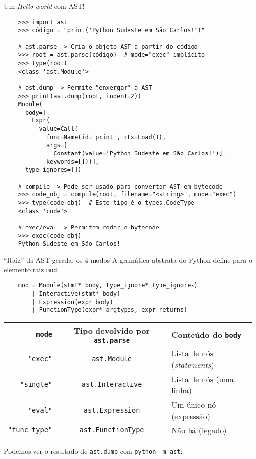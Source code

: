 \documentclass[utf8]{beamer}
\begin{document}
\begin{frame}[fragile]{Um \emph{Hello world} com AST!}
  \vspace{-.8em}%
  \begin{verbatim}
    >>> import ast
    >>> código = "print('Python Sudeste em São Carlos!')"

    # ast.parse -> Cria o objeto AST a partir do código
    >>> root = ast.parse(código)  # mode="exec" implícito
    >>> type(root)
    <class 'ast.Module'>

    # ast.dump -> Permite "enxergar" a AST
    >>> print(ast.dump(root, indent=2))
    Module(
      body=[
        Expr(
          value=Call(
            func=Name(id='print', ctx=Load()),
            args=[
              Constant(value='Python Sudeste em São Carlos!')],
            keywords=[]))],
      type_ignores=[])

    # compile -> Pode ser usado para converter AST em bytecode
    >>> code_obj = compile(root, filename="<string>", mode="exec")
    >>> type(code_obj)  # Este tipo é o types.CodeType
    <class 'code'>

    # exec/eval -> Permitem rodar o bytecode
    >>> exec(code_obj)
    Python Sudeste em São Carlos!
  \end{verbatim}
\end{frame}


\begin{frame}[fragile]{``Raiz'' da AST gerada: os 4 modos}
  A gramática abstrata do Python
  define para o elemento raiz \texttt{mod}:
  \vspace{-.8em}%
  \begin{verbatim}
    mod = Module(stmt* body, type_ignore* type_ignores)
        | Interactive(stmt* body)
        | Expression(expr body)
        | FunctionType(expr* argtypes, expr returns)
  \end{verbatim}
  \vfill
  \begin{tabular}{rcl}
    \texttt{mode}
      & Tipo devolvido por \texttt{ast.parse}
      & Conteúdo do \texttt{body} \\ \hline
    \texttt{"exec"}
      & \texttt{ast.Module}
      & Lista de nós (\emph{statements}) \\
    \texttt{"single"}
      & \texttt{ast.Interactive}
      & Lista de nós (uma linha) \\
    \texttt{"eval"}
      & \texttt{ast.Expression}
      & Um único nó (expressão) \\
    \texttt{"func_type"}
      & \texttt{ast.FunctionType}
      & Não há (legado)
  \end{tabular}
  \vspace{.5em}\vfill
  Podemos ver o resultado de \texttt{ast.dump}
  com \texttt{python -m ast}:
  \vspace{-.8em}%
  \inputminted{console}{eval_console.txt}
\end{frame}
\end{document}
